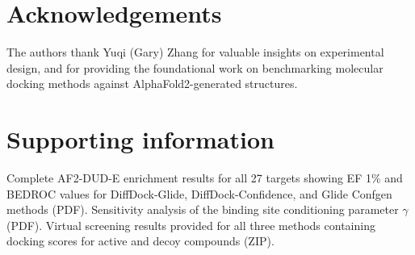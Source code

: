 \documentclass[letterpaper]{article}
\begin{document}
\section*{Acknowledgements}
The authors thank Yuqi (Gary) Zhang for valuable insights on experimental design, and for providing the foundational work on benchmarking molecular docking methods against AlphaFold2-generated structures.

\section*{Supporting information}
Complete AF2-DUD-E enrichment results for all 27 targets showing EF 1\% and BEDROC values for DiffDock-Glide, DiffDock-Confidence, and Glide Confgen methods (PDF). Sensitivity analysis of the binding site conditioning parameter $\gamma$ (PDF). Virtual screening results provided for all three methods containing docking scores for active and decoy compounds (ZIP). 



\end{document}
